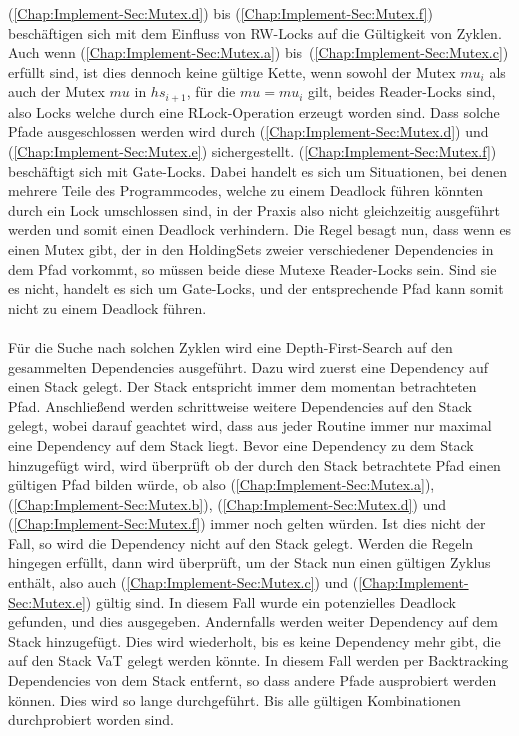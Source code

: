 (\ref{Chap:Implement-Sec:Mutex.d}) bis (\ref{Chap:Implement-Sec:Mutex.f})
beschäftigen sich mit dem Einfluss von RW-Locks auf die Gültigkeit von 
Zyklen. Auch wenn (\ref{Chap:Implement-Sec:Mutex.a}) bis~(\ref{Chap:Implement-Sec:Mutex.c})
erfüllt sind, ist dies dennoch keine gültige Kette, wenn sowohl
der Mutex $mu_i$ als auch der Mutex $mu$ in $hs_{i+1}$, 
für die $mu = mu_i$ gilt, beides Reader-Locks
sind, also Locks welche durch eine RLock-Operation erzeugt worden sind. 
Dass solche Pfade ausgeschlossen werden wird durch (\ref{Chap:Implement-Sec:Mutex.d})
und (\ref{Chap:Implement-Sec:Mutex.e}) sichergestellt.
(\ref{Chap:Implement-Sec:Mutex.f}) beschäftigt sich mit Gate-Locks. 
Dabei handelt es sich um Situationen, bei denen mehrere Teile des Programmcodes,
welche zu einem Deadlock führen könnten durch ein Lock umschlossen sind, 
in der Praxis also nicht gleichzeitig ausgeführt werden und somit einen Deadlock 
verhindern.
Die Regel besagt nun, dass wenn es einen Mutex gibt,
der in den HoldingSets zweier verschiedener Dependencies in dem Pfad vorkommt, so müssen
beide diese Mutexe Reader-Locks sein. Sind sie es nicht, handelt es sich um Gate-Locks, und
der entsprechende Pfad kann somit nicht zu einem Deadlock führen.\\\\
Für die Suche nach solchen Zyklen wird eine Depth-First-Search auf den gesammelten 
Dependencies ausgeführt. Dazu wird zuerst eine Dependency auf einen Stack gelegt. 
Der Stack entspricht immer dem momentan
betrachteten Pfad. Anschließend werden schrittweise weitere Dependencies auf den 
Stack gelegt, wobei darauf geachtet wird, dass aus jeder Routine immer nur maximal 
eine Dependency auf dem Stack liegt. Bevor eine Dependency zu dem Stack 
hinzugefügt wird, wird überprüft ob der durch den Stack betrachtete Pfad 
einen gültigen Pfad bilden würde, ob also (\ref{Chap:Implement-Sec:Mutex.a}), 
(\ref{Chap:Implement-Sec:Mutex.b}), (\ref{Chap:Implement-Sec:Mutex.d}) und 
(\ref{Chap:Implement-Sec:Mutex.f}) immer noch gelten würden. Ist dies nicht
der Fall, so wird die Dependency nicht auf den Stack gelegt. Werden die 
Regeln hingegen erfüllt, dann wird überprüft, um der Stack nun einen gültigen
Zyklus enthält, also auch (\ref{Chap:Implement-Sec:Mutex.c}) und (\ref{Chap:Implement-Sec:Mutex.e})
gültig sind. In diesem Fall wurde ein potenzielles Deadlock gefunden, und dies 
ausgegeben. Andernfalls werden weiter Dependency auf dem Stack hinzugefügt. 
Dies wird wiederholt, bis es keine Dependency mehr gibt, die auf den Stack VaT
gelegt werden könnte. In diesem Fall werden per Backtracking Dependencies 
von dem Stack entfernt, so dass andere Pfade ausprobiert werden können.
Dies wird so lange durchgeführt. Bis alle gültigen Kombinationen durchprobiert 
worden sind.

